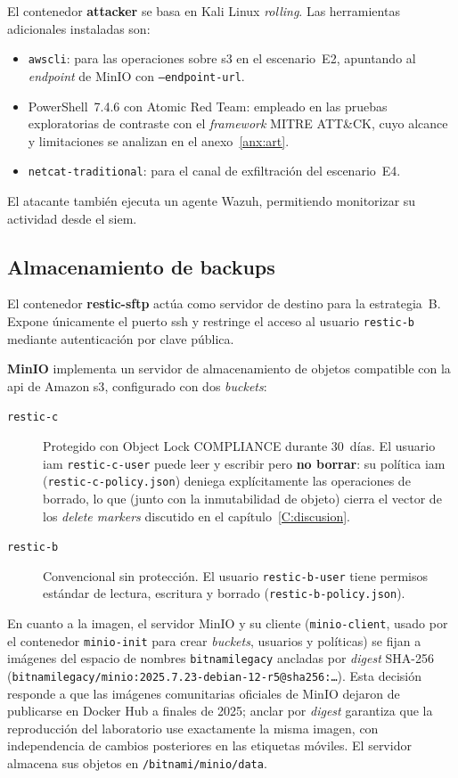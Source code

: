 \documentclass[../main.tex]{subfiles}
\begin{document}
El contenedor \textbf{attacker} se basa en Kali Linux \emph{rolling}. Las
herramientas adicionales instaladas son:

\begin{itemize}
  \item \texttt{awscli}: para las operaciones sobre \gls{s3} en el escenario~E2,
  apuntando al \emph{endpoint} de MinIO con \texttt{--endpoint-url}.
  \item PowerShell~7.4.6 con Atomic Red Team: empleado en las pruebas exploratorias
  de contraste con el \emph{framework} MITRE ATT\&CK, cuyo alcance y limitaciones
  se analizan en el anexo~\ref{anx:art}.
  \item \texttt{netcat-traditional}: para el canal de exfiltración del escenario~E4.
\end{itemize}

El atacante también ejecuta un agente Wazuh, permitiendo monitorizar su actividad
desde el \gls{siem}.

\subsection{Almacenamiento de backups}
\label{sec:almacenamiento-backups}

El contenedor \textbf{restic-sftp} actúa como servidor de destino para la
estrategia~B. Expone únicamente el puerto \gls{ssh} y restringe el acceso al
usuario \texttt{restic-b} mediante autenticación por clave pública.

\textbf{MinIO} implementa un servidor de almacenamiento de objetos compatible con
la \gls{api} de Amazon \gls{s3}, configurado con dos \emph{buckets}:

\begin{description}
  \item[\texttt{restic-c}] Protegido con Object Lock COMPLIANCE durante 30~días.
  El usuario \gls{iam} \texttt{restic-c-user} puede leer y escribir pero
  \textbf{no borrar}: su política \gls{iam} (\texttt{restic-c-policy.json})
  deniega explícitamente las operaciones de borrado, lo que (junto con la
  inmutabilidad de objeto) cierra el vector de los \emph{delete markers}
  discutido en el capítulo~\ref{C:discusion}.
  \item[\texttt{restic-b}] Convencional sin protección. El usuario
  \texttt{restic-b-user} tiene permisos estándar de lectura, escritura y borrado
  (\texttt{restic-b-policy.json}).
\end{description}

En cuanto a la imagen, el servidor MinIO y su cliente (\texttt{minio-client},
usado por el contenedor \texttt{minio-init} para crear \emph{buckets}, usuarios y
políticas) se fijan a imágenes del espacio de nombres \texttt{bitnamilegacy}
ancladas por \emph{digest} SHA-256
(\texttt{bitnamilegacy/minio:2025.7.23\allowbreak{}-debian-12-r5@sha256:\ldots}).
Esta decisión responde a que las imágenes comunitarias oficiales de MinIO dejaron
de publicarse en Docker Hub a finales de 2025; anclar por \emph{digest} garantiza
que la reproducción del laboratorio use exactamente la misma imagen, con
independencia de cambios posteriores en las etiquetas móviles. El servidor
almacena sus objetos en \texttt{/bitnami/minio/data}.
\end{document}
